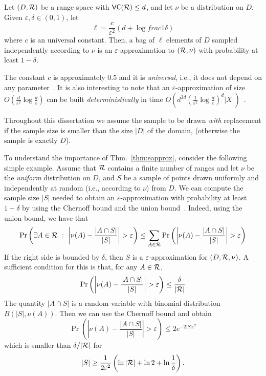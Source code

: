 \begin{theorem}\label{thm:eapprox}
  Let $(D,\mathcal{R})$ be a range space with $\mathsf{VC}(\mathcal{R})\le d$, and let $\nu$ be a distribution on $D$. Given
  $\varepsilon,\delta\in(0,1)$, let
  \begin{equation}\label{eq:vceapprox}
  \ell = \frac{c}{\varepsilon^2}\left(d + \log{frac}{1}{\delta}\right)
  \end{equation}
  where $c$ is an universal constant. Then, a bag of $\ell$
  elements of $D$ sampled independently according to $\nu$ is an
  $\varepsilon$-approximation to $(\mathcal{R},\nu)$ with probability at least
  $1-\delta$.
\end{theorem}
The constant $c$ is approximately $0.5$ and it is
\emph{universal}, i.e., it does not depend on any parameter~\citep{LofflerP09}.  
It is also interesting to note that an $\varepsilon$-approximation of size
$O(\frac{d}{\varepsilon^2}\log{\frac{d}{\varepsilon}})$ can be built
\emph{deterministically} in time
$O(d^{3d}(\frac{1}{\varepsilon^2}\log{\frac{d}{\varepsilon}})^d|X|)$~\citep{Chazelle00}.

Throughout this dissertation we assume the sample to be drawn \emph{with}
replacement if the sample size is smaller than the size $|D|$ of the domain,
(otherwise the sample is exactly $D$).  

To understand the importance of Thm.~\ref{thm:eapprox}, consider the following
simple example. Assume that $\mathcal{R}$ contains a finite number of ranges and let
$\nu$ be the \emph{uniform} distribution on $D$, and $S$ be a sample of
points drawn uniformly and independently at random (i.e., according to $\nu$)
from $D$. We can compute the sample size $|S|$ needed to obtain an
$\varepsilon$-approximation with probability at least $1-\delta$ by using the
Chernoff bound and the union
bound~\citep{MitzenmacherU05}. Indeed, using the union bound, we have that
\[
\Pr\left(\exists A\in\range ~:~ \left|\nu(A)-\frac{|A\cap
S|}{|S|}\right|>\varepsilon \right) \le \sum_{A\in\range}\Pr\left(\left|\nu(A)-\frac{|A\cap
S|}{|S|}\right|>\varepsilon\right)\]
If the right side is bounded by $\delta$, then $S$ is a
$\varepsilon$-approximation for $(D,\mathcal{R},\nu)$. A sufficient condition for
this is that, for any $A\in\mathcal{R}$,
\[
\Pr\left(\left|\nu(A)-\frac{|A\cap S|}{|S|}\right|>\varepsilon\right)\le
\frac{\delta}{|\range|}
\]
The quantity
$|A\cap S|$ is a random variable with binomial distribution $B(|S|, \nu(A))$.
Then we can use the Chernoff bound and obtain
\[
\Pr\left(\left|\nu(A)-\frac{|A\cap S|}{|S|}\right|>\varepsilon\right)\le 2e^{-2|S|\varepsilon^2}
\]
which is smaller than $\delta/|\mathcal{R}|$ for
\[
|S|\ge\frac{1}{2\varepsilon^2}\left(\ln|\mathcal{R}|+\ln 2 +\ln\frac{1}{\delta}\right).
\]

